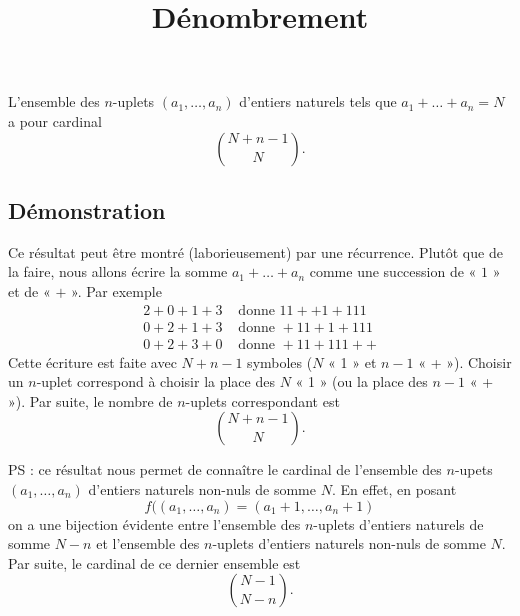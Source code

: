 \documentclass[fontsize=12pt,twoside=false,parskip=half, french]{scrartcl}
\title{Dénombrement}
\date{}
\author{}
\begin{document}
\maketitle
   \begin{Theoreme}
      L’ensemble des $n$-uplets $(a_1, \ldots, a_n)$ d’entiers naturels tels que $a_1 + \ldots + a_n = N$ a pour cardinal
      \[
         \binom{N + n - 1}{N}.
      \]
   \end{Theoreme}
   \subsection{Démonstration}
      Ce résultat peut être montré (laborieusement) par une récurrence. Plutôt que de la faire, nous allons écrire la
      somme $a_1 + \ldots + a_n$ comme une succession de « $1$ » et de « $+$ ». Par exemple
      \begin{align*}
         2 + 0 + 1 + 3 &\text{ donne } 11 + + 1 + 111\\ 
         0 + 2 + 1 + 3 &\text{ donne } + 11 + 1 + 111\\ 
         0 + 2 + 3 + 0 &\text{ donne } + 11 + 111 + +        
      \end{align*}
      Cette écriture est faite avec $N + n - 1$ symboles ($N$ « 1 » et $n - 1$ « + »). Choisir un $n$-uplet 
      correspond à choisir la place des $N$ « 1 » (ou la place des $n - 1$ « + »). Par suite, le nombre de 
      $n$-uplets correspondant est
      \[
         \binom{N + n - 1}{N}.
      \]
      
      PS : ce résultat nous permet de connaître le cardinal de l'ensemble des $n$-upets $(a_1, \ldots, a_n)$ d'entiers naturels non-nuls de somme $N$. En effet, en posant
      \[
        f((a_1, \ldots, a_n) = (a_1 + 1, \ldots, a_n + 1)
      \]
      on a une bijection évidente entre l'ensemble des $n$-uplets d'entiers naturels de somme $N - n$ et l'ensemble des $n$-uplets d'entiers naturels non-nuls de somme $N$. Par suite,
      le cardinal de ce dernier ensemble est 
      \[
         \binom{N - 1}{N - n}.
      \]
\end{document}
